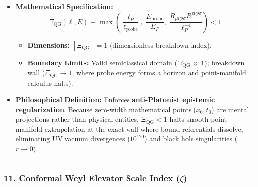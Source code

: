 \documentclass[
]{article}
\providecommand{\tightlist}{%
  \setlength{\itemsep}{0pt}\setlength{\parskip}{0pt}}
\begin{document}
\begin{itemize}
\tightlist
\item
  \textbf{Mathematical Specification:}
  \[\Xi_{\mathrm{QG}}(\ell, E) \equiv \max\!\left( \frac{\ell_P}{\ell_{\mathrm{probe}}}, \; \frac{E_{\mathrm{probe}}}{E_P}, \; \frac{R_{\mu\nu\rho\sigma}R^{\mu\nu\rho\sigma}}{\ell_P^{-4}} \right) < 1\]

  \begin{itemize}
  \tightlist
  \item
    \textbf{Dimensions:} \([\Xi_{\mathrm{QG}}] = 1\) (dimensionless
    breakdown index).
  \item
    \textbf{Boundary Limits:} Valid semiclassical domain
    (\(\Xi_{\mathrm{QG}} \ll 1\)); breakdown wall
    (\(\Xi_{\mathrm{QG}} \to 1\), where probe energy forms a horizon and
    point-manifold calculus halts).
  \end{itemize}
\item
  \textbf{Philosophical Definition:} Enforces \textbf{anti-Platonist
  epistemic regularization}. Because zero-width mathematical points
  (\(x_0, t_0\)) are mental projections rather than physical entities,
  \(\Xi_{\mathrm{QG}} < 1\) halts smooth point-manifold extrapolation at
  the exact wall where bound referentials dissolve, eliminating UV
  vacuum divergences (\(10^{120}\)) and black hole singularities
  (\(r \to 0\)).
\end{itemize}

\begin{center}\rule{0.5\linewidth}{0.5pt}\end{center}

\subsubsection{\texorpdfstring{11. Conformal Weyl Elevator Scale Index
(\(\zeta\))}{11. Conformal Weyl Elevator Scale Index (\textbackslash zeta)}}\label{conformal-weyl-elevator-scale-index-zeta}
\end{document}
